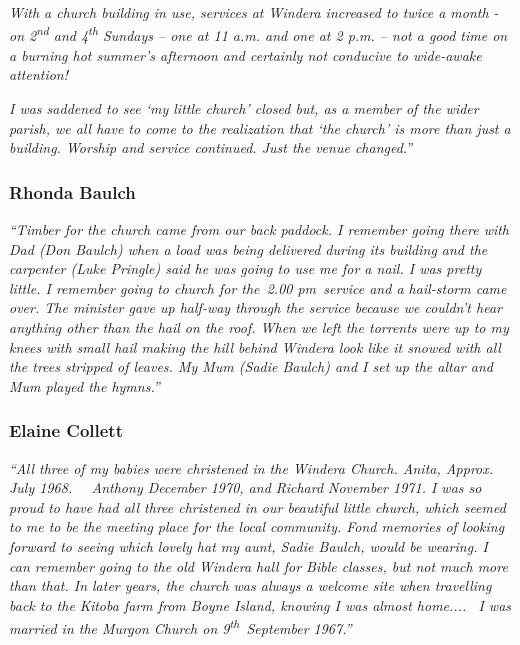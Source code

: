 \emph{With a church building in use, services at Windera increased to twice a month - on 2\textsuperscript{nd} and 4\textsuperscript{th} Sundays -- one at 11 a.m. and one at 2 p.m. -- not a good time on a burning hot summer's afternoon and certainly not conducive to wide-awake attention!}



\emph{I was saddened to see `my little church' closed but, as a member of the wider parish, we all have to come to the realization that `the church' is more than just a building. Worship and service continued. Just the venue changed.''}



\subsubsection{Rhonda Baulch}



\emph{``Timber for the church came from our back paddock. I remember going there with Dad (Don Baulch) when a load was being delivered during its building and the carpenter (Luke Pringle) said he was going to use me for a nail. I was pretty little. I remember going to church for the~2.00 pm~service and a hail-storm came over. The minister gave up half-way through the service because we couldn't hear anything other than the hail on the roof. When we left the torrents were up to my knees with small hail making the hill behind Windera look like it snowed with all the trees stripped of leaves. My Mum (Sadie Baulch) and I set up the altar and Mum played the hymns.''}



\subsubsection{Elaine Collett}



\emph{``All three of my babies were christened in the Windera Church. Anita, Approx. July 1968.~~ Anthony December 1970, and Richard November 1971. I was so proud to have had all three christened in our beautiful little church, which seemed to me to be the meeting place for the local community. Fond memories of looking forward to seeing which lovely hat my aunt, Sadie Baulch, would be wearing. I can remember going to the old Windera hall for Bible classes, but not much more than that. In later years, the church was always a welcome site when travelling back to the Kitoba farm from Boyne Island, knowing I was almost home.... ~I was married in the Murgon Church on 9\textsuperscript{th}~September 1967.''}



